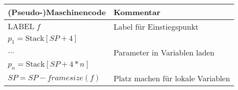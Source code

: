 \documentclass[border=0.2cm, convert={density=600}]{standalone}
\begin{document}
\renewcommand\arraystretch{1.3}
\begin{tabular}{|l|l|}
	\hline\rowcolor{lightgray}
	(Pseudo-)Maschinencode & Kommentar\\
	\hline
	 $\mathrm{LABEL}\; f$ & Label für Einstiegspunkt\\
	 \hline
	 $p_1 = \textrm{Stack}[SP + 4]$ & \\
	 $\ldots$ & Parameter in Variablen laden\\
	 $p_n = \textrm{Stack}[SP + 4\ast n]$ &\\
	 \hline
	 $SP = SP - framesize(f)$ & Platz machen für lokale Variablen\\
	\hline
\end{tabular}
\end{document}
